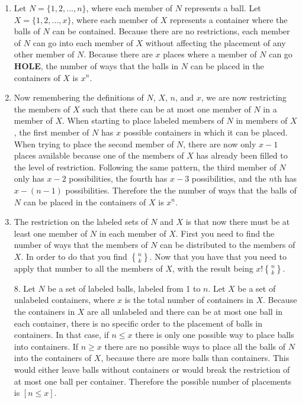 \documentclass[10pt,a4paper]{report}
\DeclareRobustCommand{\stirling}{\genfrac\{\}{0pt}{}}
\begin{document}
\begin{enumerate}
	\item Let $N=\{1, 2, ..., n\}$, where each member of $N$ represents a ball.  Let $X=\{1, 2, ..., x\}$, where each member of $X$ represents a container where the balls of $N$ can be contained.  Because there are no restrictions, each member of $N$ can go into each member of $X$ without affecting the placement of any other member of $N$.  Because there are $x$ places where a member of $N$ can go \textbf{HOLE}, the number of ways that the balls in $N$ can be placed in the containers of $X$ is $x^{n}$.
	
	\item Now remembering the definitions of $N$, $X$, $n$, and $x$, we are now restricting the members of $X$ such that there can be at most one member of $N$ in a member of $X$.  When starting to place labeled members of $N$ in members of $X$, the first member of $N$ has $x$ possible containers in which it can be placed.  When trying to place the second member of $N$, there are now only $x-1$ places available because one of the members of $X$ has already been filled to the level of restriction.  Following the same pattern, the third member of $N$ only has $x-2$ possibilities, the fourth has $x-3$ possibilities, and the $n$th has $x-(n-1)$ possibilities.  Therefore the the number of ways that the balls of $N$ can be placed in the containers of $X$ is $x^{\underline{n}}$.
	
	\item The restriction on the labeled sets of $N$ and $X$ is that now there must be at least one member of $N$ in each member of $X$.  First you need to find the number of ways that the members of $N$ can be distributed to the members of $X$.  In order to do that you find $\stirling{n}{k}$.  Now that you have that you need to apply that number to all the members of $X$, with the result being $x!\stirling{n}{k}$.
	
	\item[8.] Let $N$ be a set of labeled balls, labeled from 1 to $n$.  Let $X$ be a set of unlabeled containers, where $x$ is the total number of containers in $X$.  Because the containers in $X$ are all unlabeled and there can be at most one ball in each container, there is no specific order to the placement of balls in containers.  In that case, if $n\leq x$ there is only one possible way to place balls into containers.  If $n\geq x$ there are no possible ways to place all the balls of $N$ into the containers of $X$, because there are more balls than containers.  This would either leave balls without containers or would break the restriction of at most one ball per container.  Therefore the possible number of placements is $[n\leq x]$.
	

\end{enumerate}
\end{document}
